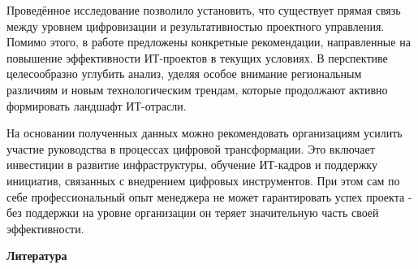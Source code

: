 \begin{multicols}{2}
Проведённое исследование позволило установить, что существует прямая
связь между уровнем цифровизации и результативностью проектного
управления. Помимо этого, в работе предложены конкретные рекомендации,
направленные на повышение эффективности ИТ-проектов в текущих условиях.
В перспективе целесообразно углубить анализ, уделяя особое внимание
региональным различиям и новым технологическим трендам, которые
продолжают активно формировать ландшафт ИТ-отрасли.

На основании полученных данных можно рекомендовать организациям усилить
участие руководства в процессах цифровой трансформации. Это включает
инвестиции в развитие инфраструктуры, обучение ИТ-кадров и поддержку
инициатив, связанных с внедрением цифровых инструментов. При этом сам по
себе профессиональный опыт менеджера не может гарантировать успех
проекта - без поддержки на уровне организации он теряет значительную
часть своей эффективности.
\end{multicols}

\begin{center}
{\bfseries Литература}
\end{center}

